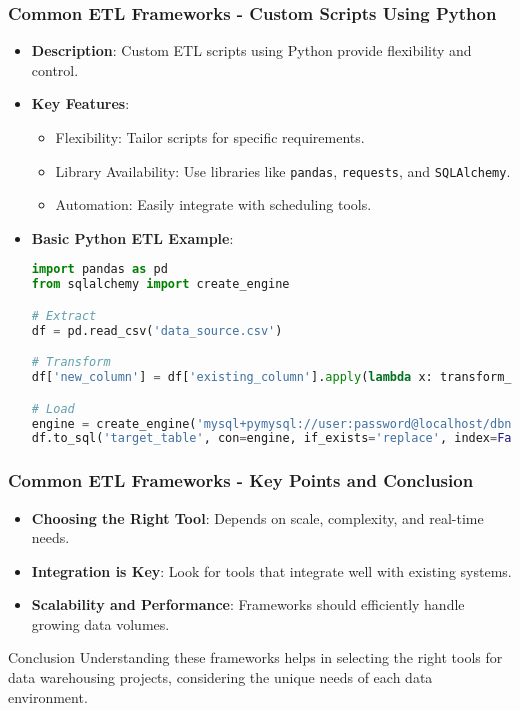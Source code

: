 \documentclass{beamer}
\begin{document}
\begin{frame}[fragile]
    \frametitle{Common ETL Frameworks - Custom Scripts Using Python}
    \begin{itemize}
        \item \textbf{Description}: Custom ETL scripts using Python provide flexibility and control.
        \item \textbf{Key Features}:
        \begin{itemize}
            \item Flexibility: Tailor scripts for specific requirements.
            \item Library Availability: Use libraries like \texttt{pandas}, \texttt{requests}, and \texttt{SQLAlchemy}.
            \item Automation: Easily integrate with scheduling tools.
        \end{itemize}
        \item \textbf{Basic Python ETL Example}:
        \begin{lstlisting}[language=Python]
import pandas as pd
from sqlalchemy import create_engine

# Extract
df = pd.read_csv('data_source.csv')

# Transform
df['new_column'] = df['existing_column'].apply(lambda x: transform_function(x))

# Load
engine = create_engine('mysql+pymysql://user:password@localhost/dbname')
df.to_sql('target_table', con=engine, if_exists='replace', index=False)
        \end{lstlisting}
    \end{itemize}
\end{frame}

\begin{frame}[fragile]
    \frametitle{Common ETL Frameworks - Key Points and Conclusion}
    \begin{itemize}
        \item \textbf{Choosing the Right Tool}: Depends on scale, complexity, and real-time needs.
        \item \textbf{Integration is Key}: Look for tools that integrate well with existing systems.
        \item \textbf{Scalability and Performance}: Frameworks should efficiently handle growing data volumes.
    \end{itemize}
    \begin{block}{Conclusion}
        Understanding these frameworks helps in selecting the right tools for data warehousing projects, considering the unique needs of each data environment.
    \end{block}
\end{frame}
\end{document}
